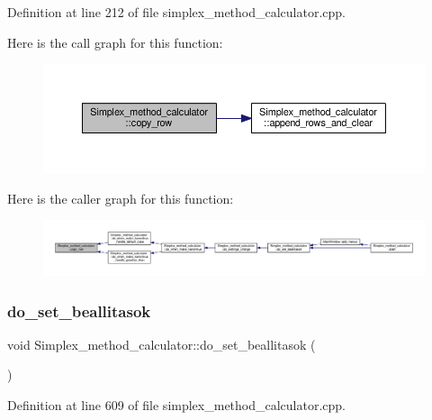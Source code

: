 Definition at line 212 of file simplex\+\_\+method\+\_\+calculator.\+cpp.

Here is the call graph for this function\+:\nopagebreak
\begin{figure}[H]
\begin{center}
\leavevmode
\includegraphics[width=350pt]{classSimplex__method__calculator_ae0e222fe5b32041564b8202f0d6c33a1_cgraph}
\end{center}
\end{figure}
Here is the caller graph for this function\+:\nopagebreak
\begin{figure}[H]
\begin{center}
\leavevmode
\includegraphics[width=350pt]{classSimplex__method__calculator_ae0e222fe5b32041564b8202f0d6c33a1_icgraph}
\end{center}
\end{figure}
\mbox{\label{classSimplex__method__calculator_a1a29425a6f5d789cfd1f2f752e017a17}} 
\subsubsection{\texorpdfstring{do\+\_\+set\+\_\+beallitasok}{do\_set\_beallitasok}}
{\footnotesize\ttfamily void Simplex\+\_\+method\+\_\+calculator\+::do\+\_\+set\+\_\+beallitasok (\begin{DoxyParamCaption}{ }\end{DoxyParamCaption})\hspace{0.3cm}{\ttfamily [slot]}}



Definition at line 609 of file simplex\+\_\+method\+\_\+calculator.\+cpp.

